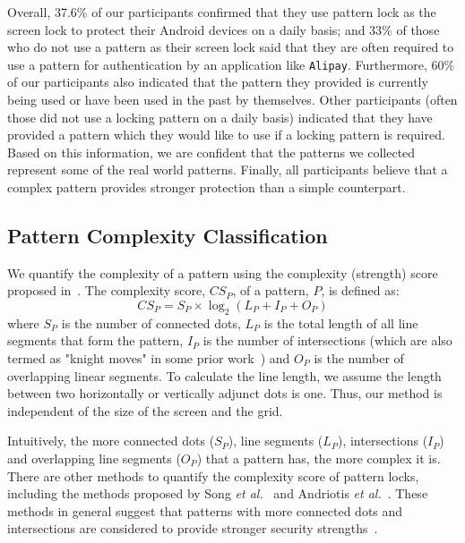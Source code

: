      Overall, 37.6\% of our participants confirmed that they use pattern lock as the screen lock to
     protect their Android devices on a daily basis; and 33\% of those  who do not use a pattern as their screen lock said that they
     are often required to use a pattern for authentication by an application like \texttt{Alipay}. Furthermore, 60\%
     of our participants also indicated that the pattern they provided is currently being used
     or have been used in the past by themselves. Other participants (often those did not use a locking pattern on a daily basis) indicated that they
     have provided a pattern which they would like to use if a locking
     pattern is required. Based on this information, we are confident
     that the patterns we collected represent some of the real world
     patterns. Finally, all participants believe that a complex pattern provides stronger protection than a simple counterpart.

    \vspace{-4mm}
    \subsection{Pattern Complexity Classification}
    \label{section: pattern-complexity-classification}
    We quantify the complexity of a pattern using the complexity (strength) score proposed in~\cite{sun2014dissecting}.
        The complexity score, $CS_{P}$, of a pattern, $P$, is defined as:
    \begin{equation}
      CS_{P}=S_{P}\times\log_{2}(L_{P}+I_{P}+O_{P})
    \label{equ:compscore}
    \end{equation}
    where $S_{P}$ is the number of connected dots, $L_{P}$ is the
    total length of all line segments that form the pattern,
    $I_{P}$ is the number of
    intersections (which are also termed as "knight moves" in some prior
    work~\cite{Von2015Easy}) and $O_{P}$ is the number of
    overlapping linear segments.  To calculate the line length,
    we assume the length between two horizontally or vertically adjunct dots
    is one. Thus, our method is independent of the size of the screen and the
    grid.


    Intuitively, the more connected dots ($S_{P}$), line segments ($L_{P}$),
    intersections ($I_{P}$) and overlapping line segments ($O_{P}$) that a
    pattern has, the more complex it is.
    There are other methods to quantify the complexity score of pattern locks, including the methods proposed by Song \emph{et al.}~\cite{Song2015On} and Andriotis \emph{et al.}~\cite{Andriotis2014Complexity}. These methods in general suggest that patterns with more connected dots and intersections are considered to provide stronger security strengths~\cite{Heidt2016Refining}.

